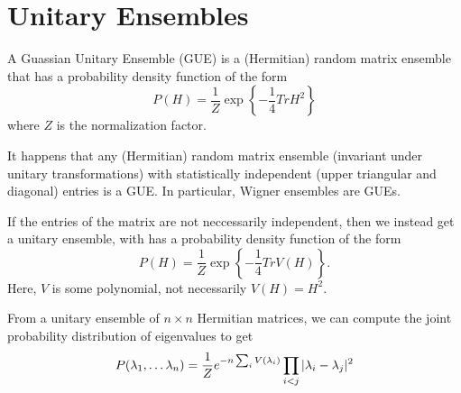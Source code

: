 \section{Unitary Ensembles}
A Guassian Unitary Ensemble (GUE) is a (Hermitian) random matrix ensemble that has a probability density function of the form
\[
    P(H) = \frac{1}{Z}\exp\left\{ -\frac{1}{4}Tr H^2 \right\}
\]
where $Z$ is the normalization factor.

It happens that any (Hermitian) random matrix ensemble (invariant under unitary transformations) with statistically independent (upper triangular and diagonal) entries is a GUE. In particular, Wigner ensembles are GUEs.

If the entries of the matrix are not neccessarily independent, then we instead get a unitary ensemble, with has a probability density function of the form
\[
    P(H) = \frac{1}{Z}\exp\left\{ -\frac{1}{4}Tr V(H) \right\}.
\]
Here, $V$ is some polynomial, not necessarily $V(H) = H^2$.

From a unitary ensemble of $n \times n$ Hermitian matrices, we can compute the joint probability distribution of eigenvalues to get
\[
    P(\lambda_1, \dots \lambda_n) = \frac{1}{Z}e^{-n \sum_i V(\lambda_i)} \prod_{i < j} |\lambda_i-\lambda_j|^2
\]
